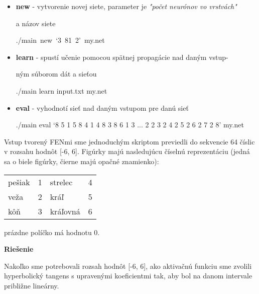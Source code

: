 \documentclass[12pt]{article}
\newcommand{\mysmallsection}[1]{\vspace{0.5cm}{\centering\large\textbf{#1}\\}\normalsize\vspace{0.5cm}}
\begin{document}
\begin{itemize}
\item \textbf{new} - vytvorenie novej siete, parameter je \textit{"počet neurónov vo vrstvách"}

\hspace{1cm} a názov siete

{\centering\small ./main~new~`3~81~2'~my.net\\}

\item \textbf{learn} - spustí učenie pomocou spätnej propagácie nad daným vstup-

\hspace{1.3cm}ným súborom dát a sieťou

{\centering\small ./main learn input.txt my.net \\}

\item \textbf{eval} - vyhodnotí sieť nad daným vstupom pre danú sieť

{\centering\small ./main eval `8 5 1 5 8 4 1 4 8 3 8 6 1 3 ... 2 2 3 2 4 2 5 2 6 2 7 2 8' my.net \\}

\end{itemize}

\mysmallsection{Prístup 1}

Vstup tvorený FENmi sme jednoduchým skriptom previedli do sekvencie 64 číslic v rozsahu hodnôt [-6, 6]. Figúrky majú nasledujúcu číselnú reprezentáciu (jedná sa o biele figúrky, čierne majú opačné znamienko):

\begin{center}
{\small
\hspace*{-1cm}\begin{tabular}{| l l | l l |}
\hline
 pešiak & 1 & strelec & 4 \\
 veža & 2 & kráľ & 5 \\
 kôň & 3 & kráľovná & 6\\
\hline
\end{tabular}
}
\end{center}

prázdne políčko má hodnotu 0.

{\vspace*{0.5cm}\centering\textbf{Riešenie}\\}

Nakoľko sme potrebovali rozsah hodnôt [-6, 6], ako aktivačnú funkciu sme zvolili hyperbolický tangens s upravenými koeficientmi tak, aby bol na danom intervale približne lineárny. 
\end{document}
